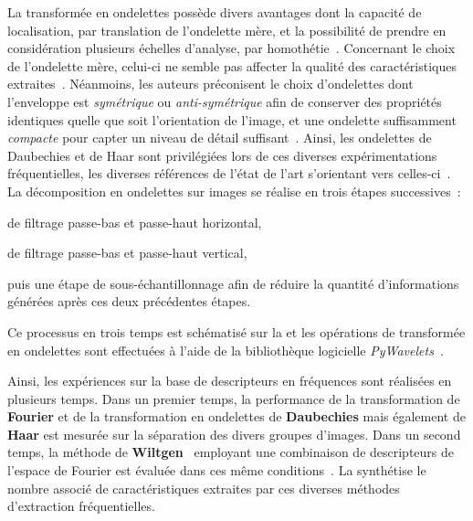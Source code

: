 La transformée en ondelettes possède divers avantages dont la capacité de localisation, par translation de l'ondelette mère, et la possibilité de prendre en considération plusieurs échelles d'analyse, par homothétie~\cite{Livens1997,Wiltgen2008}. Concernant le choix de l'ondelette mère, celui-ci ne semble pas affecter la qualité des caractéristiques extraites~\cite{Fatemi1996, Livens1997}. Néanmoins, les auteurs préconisent le choix d'ondelettes dont l'enveloppe est \textit{symétrique} ou \textit{anti-symétrique} afin de conserver des propriétés identiques quelle que soit l'orientation de l'image, et une ondelette suffisamment \textit{compacte} pour capter un niveau de détail suffisant~\cite{Livens1997}. Ainsi, les ondelettes de Daubechies et de Haar sont privilégiées lors de ces diverses expérimentations fréquentielles, les diverses références de l'état de l'art s'orientant vers celles-ci~\cite{Wiltgen2008,Halimi2017a}. La décomposition en ondelettes sur images se réalise en trois étapes successives~:~
\begin{inlinerate}
    \item de filtrage passe-bas et passe-haut horizontal,
    \item de filtrage passe-bas et passe-haut vertical,
    \item puis une étape de sous-échantillonnage afin de réduire la quantité d'informations générées après ces deux précédentes étapes.
\end{inlinerate} Ce processus en trois temps est schématisé sur la  et les opérations de transformée en ondelettes sont effectuées à l'aide de la bibliothèque logicielle \textit{PyWavelets}~\cite{lee2006}.\par

Ainsi, les expériences sur la base de descripteurs en fréquences sont réalisées en plusieurs temps. Dans un premier temps, la performance de la transformation de \textbf{Fourier} et de la transformation en ondelettes de \textbf{Daubechies} mais également de \textbf{Haar} est mesurée sur la séparation des divers groupes d'images. Dans un second temps, la méthode de \textbf{Wiltgen}~ employant une combinaison de descripteurs de l'espace de Fourier est évaluée dans ces même conditions~\cite{Wiltgen2008}. La  synthétise le nombre associé de caractéristiques extraites par ces diverses méthodes d'extraction fréquentielles.\par

